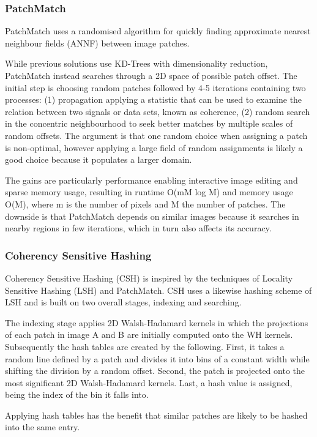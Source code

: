 \subsubsection{PatchMatch}
PatchMatch uses a randomised algorithm for quickly finding approximate nearest neighbour fields (ANNF) between image patches. 

While previous solutions use KD-Trees with dimensionality reduction, PatchMatch instead searches through a 2D space of possible patch offset. 
The initial step is choosing random patches followed by 4-5 iterations containing two processes: (1) propagation applying a statistic that can be used to examine the relation between two signals or data sets, known as coherence, (2) random search in the concentric neighbourhood to seek better matches by multiple scales of random offsets. The argument is that one random choice when assigning a patch is non-optimal, however applying a large field of random assignments is likely a good choice because it populates a larger domain. 

The gains are particularly performance enabling interactive image editing and sparse memory usage, resulting in runtime O(mM log M) and memory usage O(M), where m is the number of pixels and M the number of patches. The downside is that PatchMatch depends on similar images because it searches in nearby regions in few iterations, which in turn also affects its accuracy. 



\subsubsection{Coherency Sensitive Hashing}
Coherency Sensitive Hashing (CSH) is inspired by the techniques of Locality Sensitive Hashing (LSH) and PatchMatch. CSH uses a likewise hashing scheme of LSH and is built on two overall stages, indexing and searching. 

The indexing stage applies 2D Walsh-Hadamard kernels in which the projections of each patch in image A and B are initially computed onto the WH kernels. Subsequently the hash tables are created by the following. First, it takes a random line defined by a patch and divides it into bins of a constant width while shifting the division by a random offset. Second, the patch is projected onto the most significant 2D Walsh-Hadamard kernels. Last, a hash value is assigned, being the index of the bin it falls into. 

Applying hash tables has the benefit that similar patches are likely to be hashed into the same entry. 

